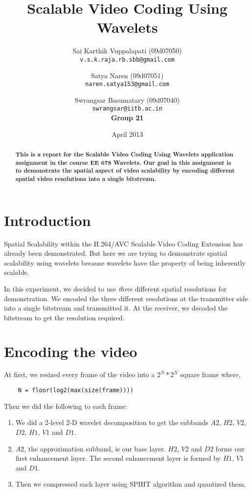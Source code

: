 \documentclass[10pt,twocolumn]{article}
\title{Scalable Video Coding Using Wavelets}
\author{Sai Karthik Vuppalapati (09d07050) \\
\texttt{v.s.k.raja.rb.sbb@gmail.com} 
\and Satya Naren (09d07051) \\
\texttt{naren.satya153@gmail.com} 
\and Swrangsar Basumatary (09d07040) \\
\texttt{swrangsar@iitb.ac.in} \\
\textbf{Group 21}}
\date{April 2013}
\begin{document}
\maketitle

\begin{abstract}
    \textbf{This is a report for the Scalable Video Coding Using Wavelets application assignment in the course EE 678 Wavelets. Our goal in this assignment is to demonstrate the spatial aspect of video scalability by encoding different spatial video resolutions into a single bitstream.}
\end{abstract}

\section{Introduction}

Spatial Scalability within the H.264/AVC Scalable Video Coding Extension has already been demonstrated\cite{segall2007}. But here we are trying to demonstrate spatial scalability using wavelets because wavelets have the property of being inherently scalable.

In this experiment, we decided to use \emph{three} different spatial resolutions for demonstration. We encoded the three different resolutions at the transmitter side into a single bitstream and transmitted it. At the receiver, we decoded the bitstream to get the resolution required.

\section{Encoding the video}

At first, we resized every frame of the video into a $2^N * 2^N$ square frame where,
\begin{verbatim}
    N = floor(log2(max(size(frame))))
\end{verbatim}

Then we did the following to each frame:
\begin{enumerate}
    \item We did a 2-level 2-D wavelet decomposition to get the subbands $A2$, $H2$, $V2$, $D2$, $H1$, $V1$ and $D1$.
    \item $A2$, the approximation subband, is our base layer. $H2$, $V2$ and $D2$ forms our first enhancement layer. The second enhancement layer is formed by $H1$, $V1$ and $D1$.
    \item Then we compressed each layer using SPIHT\cite{amirSaid1996} algorithm and quantized them.
\end{enumerate}
\end{document}
